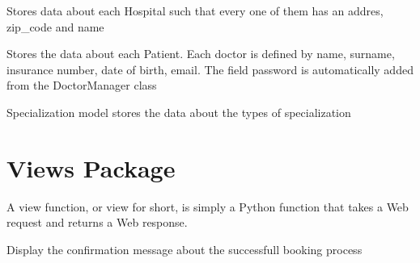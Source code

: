 \documentclass[letterpaper,10pt,english]{sphinxmanual}
\begin{document}

\begin{fulllineitems}
\label{models:doctors.models.Hospital}
Stores data about each Hospital such that every one of them has an addres, zip\_code and name

\end{fulllineitems}


\begin{fulllineitems}
\label{models:doctors.models.Patient}
Stores the data about each Patient. Each doctor is defined by name, surname, insurance number, date of birth, email. The field password is automatically added from the DoctorManager class

\end{fulllineitems}


\begin{fulllineitems}
\label{models:doctors.models.Specialization}
Specialization model stores the data about the types of specialization

\end{fulllineitems}



\chapter{Views Package}
\label{views::doc}\label{views:views-package}
A view function, or view for short, is simply a Python function that takes a Web request and returns a Web response.
\label{views:module-doctors.views}

\begin{fulllineitems}
\label{views:doctors.views.booking}
Display the confirmation message about the successfull booking process

\end{fulllineitems}
\end{document}
